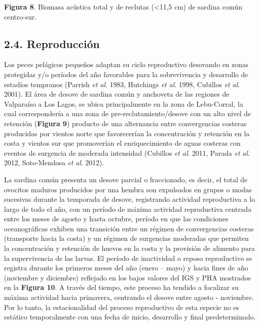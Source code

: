 \documentclass[
  spanish,
]{article}
\begin{document}
\small

\textbf{Figura 8}. Biomasa acústica total y de reclutas (\textless11,5
cm) de sardina común centro-sur. \vspace{0.5cm} \normalsize

\hypertarget{reproducciuxf3n}{%
\subsection{2.4. Reproducción}\label{reproducciuxf3n}}

Los peces pelágicos pequeños adaptan su ciclo reproductivo desovando en
zonas protegidas y/o períodos del año favorables para la sobrevivencia y
desarrollo de estadíos tempranos (Parrish \emph{et al}. 1983, Hutchings
\emph{et al}. 1998, Cubillos \emph{et al}. 2001). El área de desove de
sardina común y anchoveta de las regiones de Valparaíso a Los Lagos, se
ubica principalmente en la zona de Lebu-Corral, la cual correspondería a
una zona de pre-reclutamiento/desove con un alto nivel de retención
(\textbf{Figura 9}) producto de una alternancia entre convergencias
costeras producidas por vientos norte que favorecerían la concentración
y retención en la costa y vientos sur que promoverían el enriquecimiento
de aguas costeras con eventos de surgencia de moderada intensidad
(Cubillos \emph{et al}. 2011, Parada \emph{et al}. 2012, Soto-Mendosa
\emph{et al}. 2012).

La sardina común presenta un desove parcial o fraccionado, es decir, el
total de ovocitos maduros producidos por una hembra son expulsados en
grupos o modas sucesivas durante la temporada de desove, registrando
actividad reproductiva a lo largo de todo el año, con un período de
máxima actividad reproductiva centrada entre los meses de agosto y hasta
octubre, período en que las condiciones oceanográficas exhiben una
transición entre un régimen de convergencias costeras (transporte hacia
la costa) y un régimen de surgencias moderadas que permiten la
concentración y retención de huevos en la costa y la provisión de
alimento para la supervivencia de las larvas. El período de inactividad
o reposo reproductivo se registra durante los primeros meses del año
(enero -- mayo) y hacia fines de año (noviembre y diciembre) reflejado
en los bajos valores del IGS y PHA mostrados en la \textbf{Figura 10}. A
través del tiempo, este proceso ha tendido a focalizar su máxima
actividad hacia primavera, centrando el desove entre agosto - noviembre.
Por lo tanto, la estacionalidad del proceso reproductivo de esta especie
no es estático temporalmente con una fecha de inicio, desarrollo y final
predeterminado.
\end{document}
